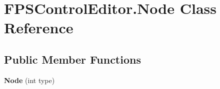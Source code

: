 \hypertarget{class_f_p_s_control_editor_1_1_node}{\section{F\-P\-S\-Control\-Editor.\-Node Class Reference}
\label{class_f_p_s_control_editor_1_1_node}
}
\subsection*{Public Member Functions}
\begin{DoxyCompactItemize}
\item 
\hypertarget{class_f_p_s_control_editor_1_1_node_acff147e90765feefa3549c84d3c50cb1}{{\bfseries Node} (int type)}\label{class_f_p_s_control_editor_1_1_node_acff147e90765feefa3549c84d3c50cb1}

\end{DoxyCompactItemize}
